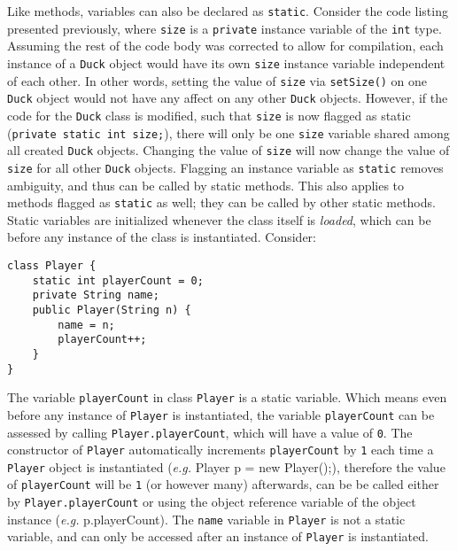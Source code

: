 \documentclass{tufte-handout}
\begin{document}
    Like methods, variables can also be declared as \texttt{static}. Consider the code listing presented previously, where \texttt{size} is a \texttt{private} instance variable of the \texttt{int} type. Assuming the rest of the code body was corrected to allow for compilation, each instance of a \texttt{Duck} object would have its own \texttt{size} instance variable independent of each other. In other words, setting the value of \texttt{size} via \texttt{setSize()} on one \texttt{Duck} object would not have any affect on any other \texttt{Duck} objects. However, if the code for the \texttt{Duck} class is modified, such that \texttt{size} is now flagged as static (\texttt{private static int size;}), there will only be one \texttt{size} variable shared among all created \texttt{Duck} objects. Changing the value of \texttt{size} will now change the value of \texttt{size} for all other \texttt{Duck} objects. Flagging an instance variable as \texttt{static} removes ambiguity, and thus can be called by static methods. This also applies to methods flagged as \texttt{static} as well; they can be called by other static methods. Static variables are initialized whenever the class itself is \emph{loaded}, which can be before any instance of the class is instantiated. Consider:

    \begin{lstlisting}
class Player {
    static int playerCount = 0;
    private String name;
    public Player(String n) {
        name = n;
        playerCount++;
    }
}
    \end{lstlisting}

    The variable \texttt{playerCount} in class \texttt{Player} is a static variable. Which means even before any instance of \texttt{Player} is instantiated, the variable \texttt{playerCount} can be assessed by calling \texttt{Player.playerCount}, which will have a value of \texttt{0}. The constructor of \texttt{Player} automatically increments \texttt{playerCount} by \texttt{1} each time a \texttt{Player} object is instantiated (\textit{e.g.} Player p = new Player();), therefore the value of \texttt{playerCount} will be \texttt{1} (or however many) afterwards, can be be called either by \texttt{Player.playerCount} or using the object reference variable of the object instance (\textit{e.g.} p.playerCount). The \texttt{name} variable in \texttt{Player} is not a static variable, and can only be accessed after an instance of \texttt{Player} is instantiated. 
\end{document}
